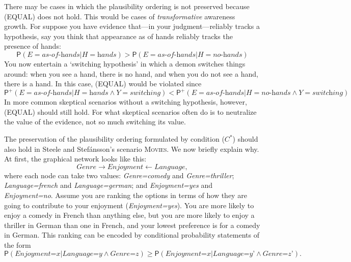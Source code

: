 \documentclass[
  11pt,
  dvipsnames,enabledeprecatedfontcommands]{scrartcl}
\newcommand{\pr}[1]{\ensuremath{\mathsf{P}(#1)}}
\newcommand{\ppr}[2]{\ensuremath{\mathsf{P}^{#1}(#2)}}
\begin{document}
There may be cases in which the plausibility ordering is not preserved
because (EQUAL) does not hold. This would be cases of
\textit{transformative} awareness growth. For suppose you have evidence
that---in your judgment---reliably tracks a hypothesis, say you think
that appearance as of hands reliably tracks the presence of hands:
\[\pr{E=\textit{as-of-hands} \vert H=\textit{hands}} > \pr{E=\textit{as-of-hands} \vert H=\textit{no-hands}} \]
You now entertain a `switching hypothesis' in which a demon switches
things around: when you see a hand, there is no hand, and when you do
not see a hand, there is a hand. In this case, (EQUAL) would be violated
since
\[\ppr{+}{E=\textit{as-of-hands} \vert H=\textit{hands} \wedge Y=\textit{switching}} < \ppr{+}{E=\textit{as-of-hands} \vert H=\textit{no-hands} \wedge Y=\textit{switching}}\]
In more common skeptical scenarios without a switching hypothesis,
however, (EQUAL) should still hold. For what skeptical scenarios often
do is to neutralize the value of the evidence, not so much switching its
value.

The preservation of the plausibility ordering formulated by condition
(\(C^*\)) should also hold in Steele and Stefánsson's scenario
\textsc{Movies}. We now briefly explain why. At first, the graphical
network looks like this:
\[\textit{Genre} \rightarrow \textit{Enjoyment} \leftarrow \textit{Language},\]
where each node can take two values: \textit{Genre=comedy} and
\textit{Genre=thriller}; \textit{Language=french} and
\textit{Language=german}; and \textit{Enjoyment=yes} and
\textit{Enjoyment=no}. Assume you are ranking the options in terms of
how they are going to contribute to your enjoyment
(\textit{Enjoyment=yes}). You are more likely to enjoy a comedy in
French than anything else, but you are more likely to enjoy a thriller
in German than one in French, and your lowest preference is for a comedy
in German. This ranking can be encoded by conditional probability
statements of the form
\[\pr{\textit{Enjoyment=x} \vert \textit{Language=y} \wedge \textit{Genre=z}} \geq \pr{\textit{Enjoyment=x} \vert \textit{Language=y'} \wedge \textit{Genre=z'}}.\]
\end{document}
